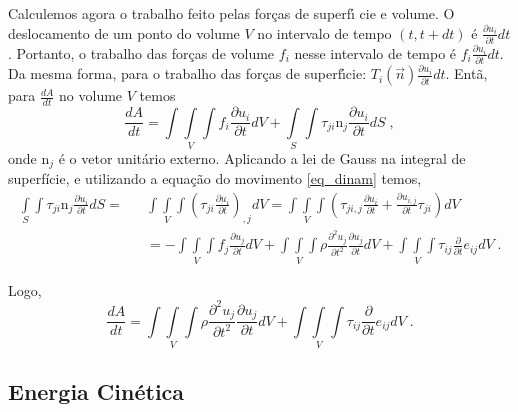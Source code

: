 Calculemos agora  o trabalho feito pelas for\c{c}as de superf\'\i
cie e volume. O deslocamento de um ponto do volume $V$ no
intervalo de tempo $(t,t+dt)$ \'e $\frac{\partial u_{i}}{\partial
t}dt$. Portanto, o trabalho das  for\c{c}as de volume $f_{i}$ nesse
intervalo de tempo \'e $f_{i}\frac{\partial
u_{i}}{\partial t}dt$. Da mesma forma, para o trabalho das
for\c{c}as de  superf\'\i cie: $T_{i}(\vec{n})\frac{\partial
u_{i}}{\partial t}dt$. Ent\~a, para $\frac{dA}{dt}$ no volume $V$ temos
\begin{equation}
\frac{dA}{dt}=\int \! \!\int\limits_{V} \! \!\int f_{i}\frac{\partial u_{i}}{\partial t}dV+\int\limits_{S} \! \!\int
\tau_{ji}\mbox{n}_{j}\frac{\partial u_{i}}{\partial t}dS \;,
\end{equation}
onde
$\mbox{n}_{j}$ \'e o vetor unit\'ario externo. Aplicando a lei de
Gauss na integral de superf\'icie, e utilizando a equa\c{c}\~ao do movimento \ref{eq_dinam} temos,
\begin{equation}
\begin{array}{rcl}
\int\limits_{S} \! \!\int \tau_{ji}\mbox{n}_{j}\frac{\partial u_{i}}{\partial t}dS= 
&& \int \! \!\int\limits_{V} \! \!\int \left(\tau_{ji}\frac{\partial
u_{i}}{\partial t}\right)_{,j}dV= \int \! \!\int\limits_{V} \!
\!\int \left(\tau_{ji,j}\frac{\partial u_{i}}{\partial t}+
\frac{\partial u_{i,j}}{\partial t}\tau_{ji}\right)dV \\
&& =-\int \! \!\int\limits_{V} \! \!\int f_{j}\frac{\partial u_{j}}{\partial t}dV+
\int \! \!\int\limits_{V} \! \!\int \rho\frac{\partial^{2}
u_{j}}{\partial t^{2}}\frac{\partial u_{j}}{\partial t}dV+ \int \!
\!\int\limits_{V} \! \!\int \tau_{ij}\frac{\partial}{\partial
t}e_{ij}dV \;.
\end{array}
\end{equation}

Logo,
\begin{equation}
\frac{dA}{dt}=\int \! \!\int\limits_{V} \! \!\int \rho\frac{\partial^{2} u_{j}}{\partial t^{2}}\frac{\partial u_{j}}{\partial t}dV+
\int \! \!\int\limits_{V} \! \!\int
\tau_{ij}\frac{\partial}{\partial t}e_{ij}dV \;.
\end{equation}

\subsection{Energia Cin\'etica}

